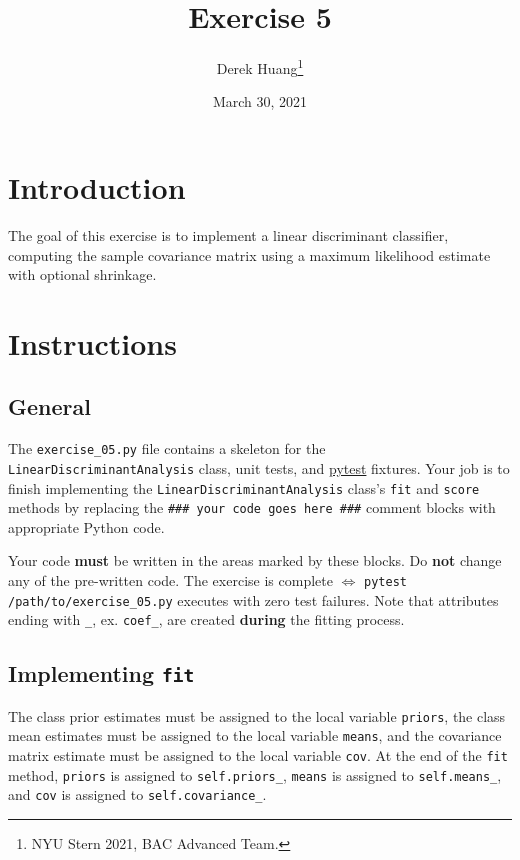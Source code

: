 \documentclass{article}
\title{Exercise 5}
\author{Derek Huang\thanks{NYU Stern 2021, BAC Advanced Team.}}
\date{March 30, 2021}
\numberwithin{equation}{section}
\newcommand{\pytest}{\href{https://docs.pytest.org/en/stable/}{pytest}}
\begin{document}
\maketitle
\thispagestyle{fancy}


\section{Introduction}

The goal of this exercise is to implement a linear discriminant classifier,
computing the sample covariance matrix using a maximum likelihood estimate
with optional shrinkage.

\section{Instructions}

\subsection{General}

The \texttt{exercise\_05.py} file contains a skeleton for the
\texttt{LinearDiscriminantAnalysis} class, unit tests, and \pytest{} fixtures.
Your job is to finish implementing the \texttt{LinearDiscriminantAnalysis}
class's \texttt{fit} and \texttt{score} methods by replacing the
\texttt{\#\#\# your code goes here \#\#\#} comment blocks with appropriate
Python code.

\medskip

Your code \textbf{must} be written in the areas marked by these blocks. Do
\textbf{not} change any of the pre-written code. The exercise is complete
$ \Leftrightarrow $ \texttt{pytest /path/to/exercise\_05.py} executes with
zero test failures. Note that attributes ending with \texttt{\_}, ex.
\texttt{coef\_}, are created \textbf{during} the fitting process.

\subsection{Implementing \texttt{fit}}

The class prior estimates must be assigned to the local variable
\texttt{priors}, the class mean estimates must be assigned to the local
variable \texttt{means}, and the covariance matrix estimate must be assigned
to the local variable \texttt{cov}. At the end of the \texttt{fit} method,
\texttt{priors} is assigned to \texttt{self.priors\_}, \texttt{means} is
assigned to \texttt{self.means\_}, and \texttt{cov} is assigned to
\texttt{self.covariance\_}.
\end{document}
